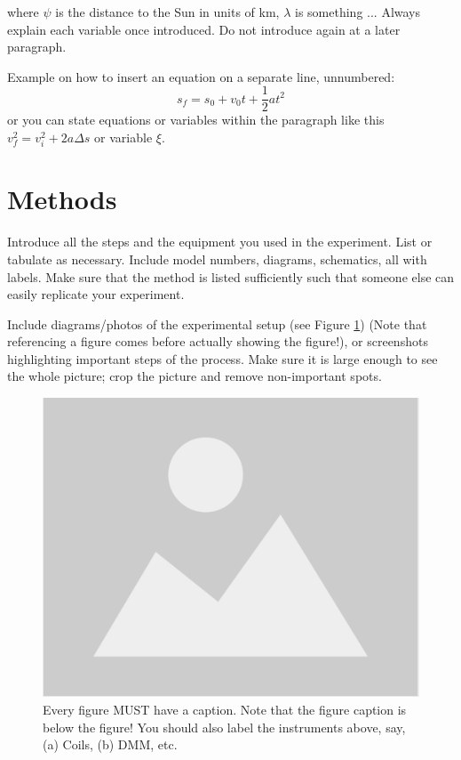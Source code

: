 \documentclass[letterpaper,11pt]{article}
\begin{document}
where $\psi$ is the distance to the Sun in units of km, $\lambda$ is something ... Always explain each variable once introduced. Do not introduce again at a later paragraph.

Example on how to insert an equation on a separate line, unnumbered:
$$s_f=s_0+v_0t+\frac{1}{2}at^2$$
or you can state equations or variables within the paragraph like this $v_f^2=v_i^2+2a\Delta s$ or variable $\xi$.

\section{Methods}
Introduce all the steps and the equipment you used in the experiment. List or tabulate as necessary. Include model numbers, diagrams, schematics, all with labels. Make sure that the method is listed sufficiently such that someone else can easily replicate your experiment.

Include diagrams/photos of the experimental setup (see Figure \ref{fig1}) (Note that referencing a figure comes before actually showing the figure!), or screenshots highlighting important steps of the process. Make sure it is large enough to see the whole picture; crop the picture and remove non-important spots.

\begin{figure}[ht]
        \centering \includegraphics[width=0.9\columnwidth]{placeholder-image}
        \caption{\label{fig1}Every figure MUST have a caption. Note that the figure caption is below the figure! You should also label the instruments above, say, (a) Coils, (b) DMM, etc.
        }
\end{figure}
\end{document}
